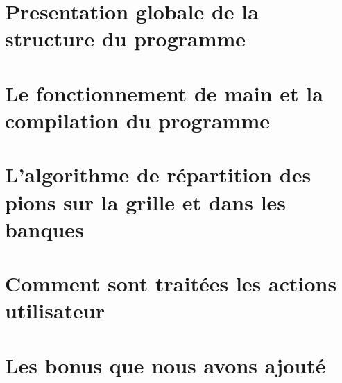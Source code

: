 


\maketitle

\tableofcontents

\section{Presentation globale de la structure du programme}



\section{Le fonctionnement de main et la compilation du programme}



\section{L'algorithme de répartition des pions sur la grille et dans les banques}



\section{Comment sont traitées les actions utilisateur}



\section{Les bonus que nous avons ajouté}




